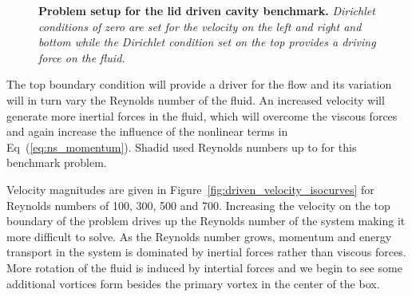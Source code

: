 \begin{figure}[t!]
  \begin{center}
    \scalebox{1.5}{
       }
  \end{center}
  \caption{\textbf{Problem setup for the lid driven cavity benchmark.}
    \textit{Dirichlet conditions of zero are set for the velocity on
      the left and right and bottom while the Dirichlet condition set
      on the top provides a driving force on the fluid.}}
  \label{fig:lid_driven_cavity}
\end{figure}

The top boundary condition will provide a driver for the flow and its
variation will in turn vary the Reynolds number of the fluid. An
increased velocity will generate more inertial forces in the fluid,
which will overcome the viscous forces and again increase the
influence of the nonlinear terms in Eq~(\ref{eq:ns_momentum}). Shadid
used Reynolds numbers up to  for this benchmark problem.

Velocity magnitudes are given in
Figure~\ref{fig:driven_velocity_isocurves} for Reynolds numbers of
100, 300, 500 and 700. Increasing the velocity on the top boundary of
the problem drives up the Reynolds number of the system making it more
difficult to solve.  As the Reynolds number grows, momentum and energy
transport in the system is dominated by inertial forces rather than
viscous forces. More rotation of the fluid is induced by intertial
forces and we begin to see some additional vortices form besides the
primary vortex in the center of the box.


